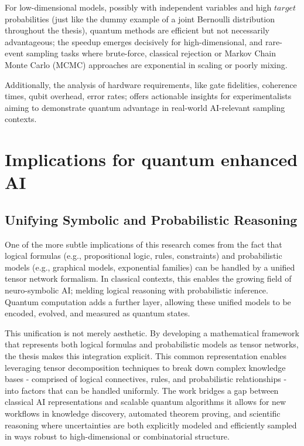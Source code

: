 \documentclass[encoding=utf8,british]{tumphthesis}
\begin{document}
        For low-dimensional models, possibly with independent variables and high $target$ probabilities (just like the dummy example of a joint Bernoulli distribution throughout the thesis), 
        quantum methods are efficient but not necessarily advantageous; the speedup emerges decisively for 
        high-dimensional, and rare-event sampling tasks where brute-force, classical rejection or Markov Chain Monte Carlo (MCMC) approaches are exponential in scaling or poorly mixing.

        Additionally, the analysis of hardware requirements, like gate fidelities, coherence times, qubit overhead, error rates; offers actionable insights for experimentalists aiming to demonstrate 
        quantum advantage in real-world AI-relevant sampling contexts.

    \section{Implications for quantum enhanced AI}
        \subsection{Unifying Symbolic and Probabilistic Reasoning}
        One of the more subtle implications of this research comes from the fact that logical formulas (e.g., propositional logic, rules, constraints) and probabilistic models (e.g., graphical models, 
        exponential families) can be handled by a unified tensor network formalism. In classical contexts, this enables the growing field of neuro-symbolic AI; melding logical reasoning with probabilistic inference. 
        Quantum computation adds a further layer, allowing these unified models to be encoded, evolved, and measured as quantum states.

        This unification is not merely aesthetic. By developing a mathematical framework that represents both logical formulas and probabilistic models as tensor networks, the thesis makes this integration explicit. 
        This common representation enables leveraging tensor decomposition techniques to break down complex knowledge bases - comprised of logical connectives, rules, and probabilistic relationships - into factors that 
        can be handled uniformly. The work bridges a gap between classical AI representations and scalable quantum algorithms it allows for new workflows in knowledge discovery, automated theorem proving, and scientific 
        reasoning where uncertainties are both explicitly modeled and efficiently sampled in ways robust to high-dimensional or combinatorial structure.
\end{document}
